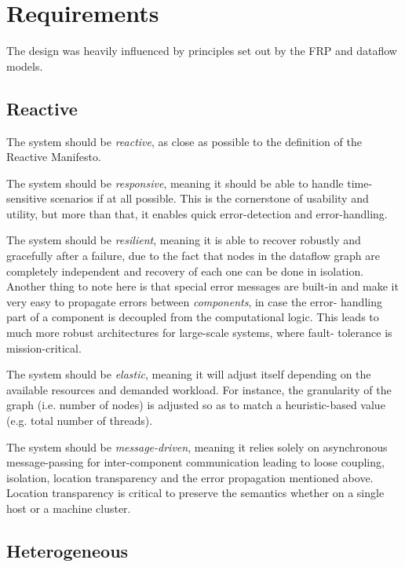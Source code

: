 \documentclass[sigplan,review,anonymous]{acmart}
\begin{document}

\section{Requirements} \label{sec:requirements}

The design was heavily influenced by principles set out by the FRP and dataflow
models.

\subsection{Reactive}

The system should be \textit{reactive}, as close as possible to the definition
of the Reactive Manifesto\cite{manifesto}.

The system should be \textit{responsive}, meaning it should be able to handle
time-sensitive scenarios if at all possible. This is the cornerstone of
usability and utility, but more than that, it enables quick error-detection and
error-handling.

The system should be \textit{resilient}, meaning it is able to recover robustly
and gracefully after a failure, due to the fact that nodes in the dataflow graph
are completely independent and recovery of each one can be done in isolation.
Another thing to note here is that special error messages are built-in and make
it very easy to propagate errors between \textit{components}, in case the error-
handling part of a component is decoupled from the computational logic. This
leads to much more robust architectures for large-scale systems, where fault-
tolerance is mission-critical.

The system should be \textit{elastic}, meaning it will adjust itself depending
on the available resources and demanded workload. For instance, the granularity
of the graph (i.e. number of nodes) is adjusted so as to match a heuristic-based
value (e.g. total number of threads).

The system should be \textit{message-driven}, meaning it relies solely on
asynchronous message-passing for inter-component communication leading to loose
coupling, isolation, location transparency and the error propagation mentioned
above. Location transparency is critical to preserve the semantics whether on a
single host or a machine cluster.


\subsection{Heterogeneous}
\end{document}
